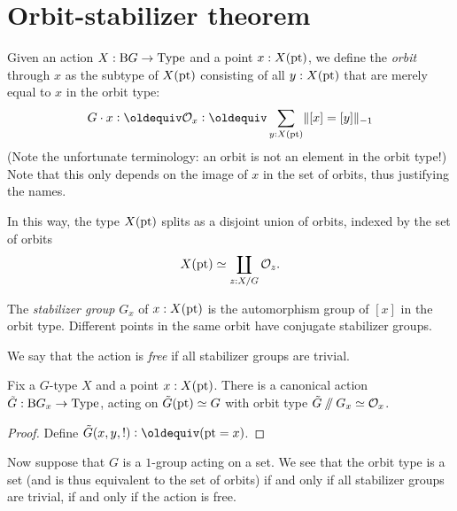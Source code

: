 
\section{Orbit-stabilizer theorem}
\label{sec:orbit-stabilizer-theorem}

Given an action $X : \mathrm B G \to \mathord{\mathrm{Type}}$ and a point $x : X({\mathord{\mathrm{pt}}})$, we define
the \emph{orbit} through $x$ as the subtype of $X({\mathord{\mathrm{pt}}})$ consisting of
all $y : X({\mathord{\mathrm{pt}}})$ that are merely equal to $x$ in the orbit type:
\[
  G\cdot x \defeq \mathcal O_x \defeq \sum_{y : X(\pt)} \merely{[x] = [y]}
\]
(Note the unfortunate terminology: an orbit is not an element in the
orbit type!)
Note that this only depends on the image of $x$ in the set of orbits,
thus justifying the names.

In this way, the type $X({\mathord{\mathrm{pt}}})$ splits as a disjoint union of orbits,
indexed by the set of orbits
\[
  X({\mathord{\mathrm{pt}}}) \simeq \coprod_{z : X / G} \mathcal O_z.
\]

The \emph{stabilizer group} $G_x$ of $x : X({\mathord{\mathrm{pt}}})$ is the automorphism group of $[x]$ in the orbit type.
Different points in the same orbit have conjugate stabilizer groups.

We say that the action is \emph{free} if all stabilizer groups are trivial.

\begin{theorem}
  Fix a $G$-type $X$ and a point $x : X({\mathord{\mathrm{pt}}})$.
  There is a canonical action $\tilde G : \mathrm B G_x \to \mathord{\mathrm{Type}}$,
  acting on $\tilde G({\mathord{\mathrm{pt}}})\simeq G$
  with orbit type $\tilde G\mathbin{/\kern-3pt/} G_x \simeq \mathcal O_x$.
\end{theorem}
\begin{proof}
  Define $\tilde G(x,y,!) \defeq (\pt = x)$.
\end{proof}

Now suppose that $G$ is a $1$-group acting on a set.
We see that the orbit type is a set
(and is thus equivalent to the set of orbits)
if and only if
all stabilizer groups are trivial,
\ie if and only if the action is free.

